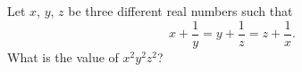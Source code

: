 Let $x$, $y$, $z$ be three different real numbers such that
\[
x+\dfrac{1}{y}=y+\dfrac{1}{z}=z+\dfrac{1}{x} .
\]
What is the value of $x^2y^2z^2$?
